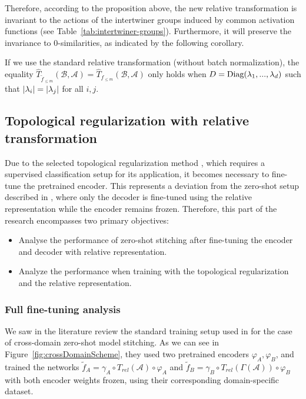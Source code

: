 \documentclass[../main.tex]{subfiles}
\begin{document}
Therefore, according to the proposition above, the new relative transformation is invariant to the actions of the intertwiner groups induced by common activation functions (see Table~\ref{tab:intertwiner-groups}). Furthermore, it will preserve the invariance to $0$-similarities, as indicated by the following corollary.

\begin{corollary}
If we use the standard relative transformation (without batch normalization), the equality $\hat{T}_{\tilde{f}_{\leq m}}(\mathcal{B}, \mathcal{A}) = \hat{T}_{f_{\leq m}}(\mathcal{B}, \mathcal{A})$ only holds when $D=\text{\rm Diag}(\lambda_1,..., \lambda_d)$ such that $\left\lvert \lambda_i \right\rvert=\left\lvert \lambda_j \right\rvert$ for all $i, j$.
\end{corollary}

\subsection{Topological regularization with relative transformation}
\label{sec:topo_meth}

Due to the selected topological regularization method \cite{hofer_densified_2021}, which requires a supervised classification setup for its application, it becomes necessary to fine-tune the pretrained encoder. This represents a deviation from the zero-shot setup described in \cite{moschella_relative_2022}, where only the decoder is fine-tuned using the relative representation while the encoder remains frozen. Therefore, this part of the research encompasses two primary objectives:

\begin{itemize}
    \item Analyse the performance of zero-shot stitching after fine-tuning the encoder and decoder with relative representation.
    
    \item Analyze the performance when training with the topological regularization and the relative representation. 
\end{itemize}

\subsubsection*{Full fine-tuning analysis}

We saw in the literature review the standard training setup used in \cite{moschella_relative_2022} for the case of cross-domain zero-shot model stitching. As we can see in Figure~\ref{fig:crossDomainScheme}, they used two pretrained encoders $\varphi_A, \varphi_B$, and trained the networks $\tilde{f}_{A}=\gamma_A \circ T_{rel}(\mathcal{A})  \circ \varphi_A$ and $\tilde{f}_{B}=\gamma_B \circ T_{rel}(\Gamma(\mathcal{A}))  \circ \varphi_B$ with both encoder weights frozen, using their corresponding domain-specific dataset.
\end{document}
